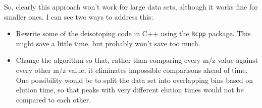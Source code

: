 \documentclass{article}
\begin{document}
So, clearly this approach won't work for large data sets, although it works fine for smaller ones. I can see two ways to address this:

\begin{itemize}
  \item Rewrite some of the deisotoping code in C++ using the \texttt{Rcpp} package. This might save a little time, but probably won't save too much.
  \item Change the algorithm so that, rather than comparing every m/z value against every other m/z value, it eliminates impossible comparisons ahead of time. One possibility would be to split the data set into overlapping bins based on elution time, so that peaks with very different elution times would not be compared to each other. 
\end{itemize}
\end{document}

